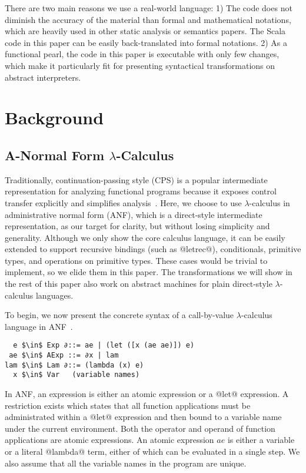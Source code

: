 \documentclass[acmsmall,review,anonymous]{acmart}\settopmatter{printfolios=true,printccs=false,printacmref=false}
\begin{document}
There are two main reasons we use a real-world language:
1) The code does not diminish the accuracy of the material
than formal and mathematical notations,
which are heavily used in other static analysis or semantics papers.
The Scala code in this paper can be easily back-translated into formal notations.
2) As a functional pearl, the code in this paper is executable with only few changes,
which make it particularly fit for presenting syntactical transformations on abstract
interpreters.
\fi

\section{Background} \label{background}

\subsection{A-Normal Form $\lambda$-Calculus} \label{anfsyntax}

Traditionally, continuation-passing style (CPS) is a popular intermediate representation
for analyzing functional programs because it exposes control transfer explicitly
and simplifies analysis~\cite{Shivers:1991:SSC:115865.115884, Shivers:1988:CFA:53990.54007}.
Here, we choose to use $\lambda$-calculus in administrative normal form (ANF),
which is a direct-style intermediate representation, as our target for clarity,
but without losing simplicity and generality.
Although we only show the core calculus language, it can be easily extended
to support recursive bindings (such as @letrec@), conditionals, primitive types, and
operations on primitive types. These cases would be trivial to implement,
so we elide them in this paper.
The transformations we will show in the rest of this paper
also work on abstract machines for plain direct-style $\lambda$-calculus languages.

To begin, we now present the concrete syntax of a call-by-value $\lambda$-calculus language
in ANF~\cite{flanagan1993essence}.

\begin{lstlisting}
  e $\in$ Exp ∂::= ae | (let ([x (ae ae)]) e)
 ae $\in$ AExp ::= ∂x | lam
lam $\in$ Lam ∂::= (lambda (x) e)
  x $\in$ Var   (variable names)
\end{lstlisting}

In ANF, an expression is either an atomic expression or a @let@ expression.
A restriction exists which states that all function applications must be administrated
within a @let@ expression and then bound to a variable name under the current environment.
Both the operator and operand of function applications are atomic expressions.
An atomic expression $ae$ is either a variable or a literal @lambda@ term, either of which
can be evaluated in a single step.
We also assume that all the variable names in the program are unique.
\end{document}
